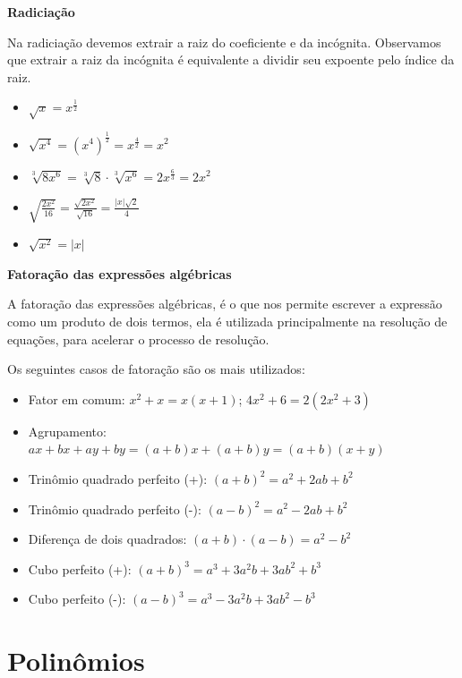   \vskip0.3cm

  \textbf{Radiciação}

  Na radiciação devemos extrair a raiz do coeficiente e da incógnita. Observamos que extrair a raiz da incógnita é equivalente a dividir seu expoente pelo índice da raiz.
    \begin{itemize}
     \item $\sqrt{x}= x^{\frac{1}{2}}$
     \item $\sqrt{x^4}= (x^4)^{\frac{1}{2}}= x^{\frac{4}{2}}= x^2$
     \item $\sqrt[3]{8x^6}= \sqrt[3]{8} \cdot \sqrt[3]{x^6}= 2 x^{\frac{6}{3}}= 2x^2$
     \item $\sqrt{\frac{2x^2}{16}}= \frac{\sqrt{2x^2}}{\sqrt{16}}= \frac{|x|\sqrt{2}}{4}$
     \item $\sqrt{x^2}= |x|$
    \end{itemize}

 \vskip0.3cm

  \textbf{Fatoração das expressões algébricas}

 \vskip0.3cm

 A fatoração das expressões algébricas, é o que nos permite escrever a expressão como um produto de dois termos, ela é utilizada principalmente na resolução de equações, para acelerar o processo de resolução.

 Os seguintes casos de fatoração são os mais utilizados:
 \begin{itemize}
  \item Fator em comum: $x^2 + x= x(x + 1)$; $4x^2 + 6= 2(2x^2 + 3)$
  \item Agrupamento: $ax + bx + ay + by= (a+b)x+(a+b)y= (a+b)(x+y)$
  \item Trinômio quadrado perfeito (+): $(a + b)^2= a^2 + 2ab + b^2$
  \item Trinômio quadrado perfeito (-): $(a - b)^2= a^2 - 2ab + b^2$
  \item Diferença de dois quadrados: $(a + b) \cdot (a - b)= a^2 - b^2$
  \item Cubo perfeito (+): $(a+b)^3= a^3 + 3a^2b + 3ab^2 + b^3$
  \item Cubo perfeito (-): $(a-b)^3= a^3 - 3a^2b + 3ab^2 - b^3$
 \end{itemize}
 
 \newpage
 \section{Polinômios}
 
